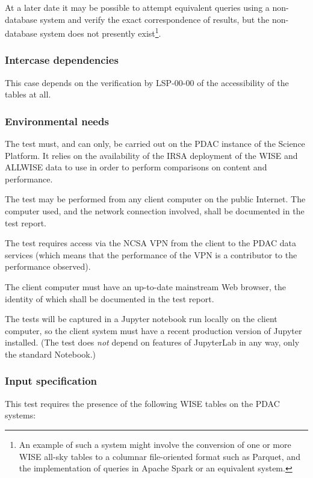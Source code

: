 At a later date it may be possible to attempt equivalent queries using a non-database system and verify the exact correspondence of results, but the non-database system does not presently exist\footnote{An example of such a system might involve the conversion of one or more WISE all-sky tables to a columnar file-oriented format such as Parquet, and the implementation of queries in Apache Spark or an equivalent system.}.

\subsubsection{Intercase dependencies}

This case depends on the verification by LSP-00-00 of the accessibility of the tables at all.

\subsubsection{Environmental needs}

The test must, and can only, be carried out on the PDAC instance of the Science Platform.
It relies on the availability of the IRSA deployment of the WISE and ALLWISE data to use in order to perform comparisons on content and performance.

The test may be performed from any client computer on the public Internet.
The computer used, and the network connection involved, shall be documented in the test report.

The test requires access via the NCSA VPN from the client to the PDAC data services 
(which means that the performance of the VPN is a contributor to the performance observed).

The client computer must have an up-to-date mainstream Web browser, the identity of which shall be documented in the test report.

The tests will be captured in a Jupyter notebook run locally on the client computer, so the client system must have a recent production version of Jupyter installed.
(The test does \emph{not} depend on features of JupyterLab in any way, only the standard Notebook.)


\subsubsection{Input specification}

This test requires the presence of the following WISE tables on the PDAC systems:

